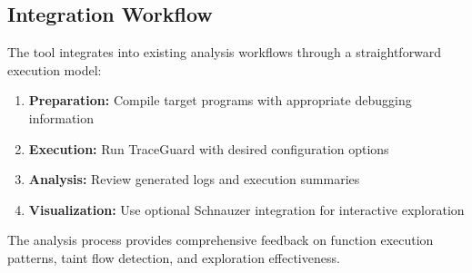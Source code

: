 \subsection{Integration Workflow}

The tool integrates into existing analysis workflows through a straightforward execution model:

\begin{enumerate}
    \item \textbf{Preparation:} Compile target programs with appropriate debugging information
    \item \textbf{Execution:} Run TraceGuard with desired configuration options
    \item \textbf{Analysis:} Review generated logs and execution summaries
    \item \textbf{Visualization:} Use optional Schnauzer integration for interactive exploration
\end{enumerate}

The analysis process provides comprehensive feedback on function execution patterns, taint flow detection, and exploration effectiveness.
